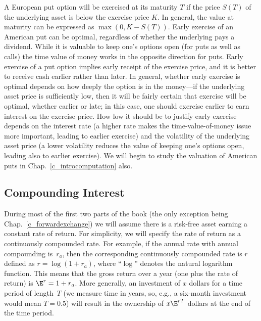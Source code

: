 A European put option will be exercised at its maturity $T$ if the price $S(T)$ of the underlying asset is below the exercise price $K$.  In general, the value at maturity can be expressed as $\max(0,K-S(T))$.  Early exercise of an American put can be optimal, regardless of whether the underlying pays a dividend.  While it is valuable to keep one's options open (for puts as well as calls) the time value of money works in the opposite direction for puts.  Early exercise of a put option implies early receipt of the exercise price, and it is better to receive cash earlier rather than later. In general, whether early exercise is optimal depends on how deeply the option is in the money---if the underlying asset price is sufficiently low, then it will be fairly certain that exercise will be optimal, whether earlier or late; in this case, one should exercise earlier to earn interest on the exercise price.  How low it should be to justify early exercise depends on the interest rate (a higher rate makes the time-value-of-money issue more important, leading to earlier exercise) and the volatility of the underlying asset price (a lower volatility reduces the value of keeping one's options open, leading also to earlier exercise).  We will begin to study the valuation of American puts in Chap.~\ref{c_introcomputation} also.

\subsection*{Compounding Interest}

During most of the first two parts of the book (the only exception being Chap.~\ref{c_forwardexchange}) we will assume there is a risk-free asset earning a constant rate of return.   For simplicity, we will specify the rate of return as a continuously compounded rate.   For example, if the annual rate with annual compounding is~$r_a$, then the corresponding continuously compounded rate is $r$ defined as $r = \log (1+r_a)$, where ``$\log$'' denotes the natural logarithm function.  This means that the gross return over a year (one plus the rate of return) is $\E^r = 1+r_a$.  More generally, an investment of $x$ dollars for a time period of length~$T$ (we measure time in years, so, e.g., a six-month investment would mean $T=0.5$) will result in the ownership of $x\E^{rT}$ dollars at the end of the time period.  

